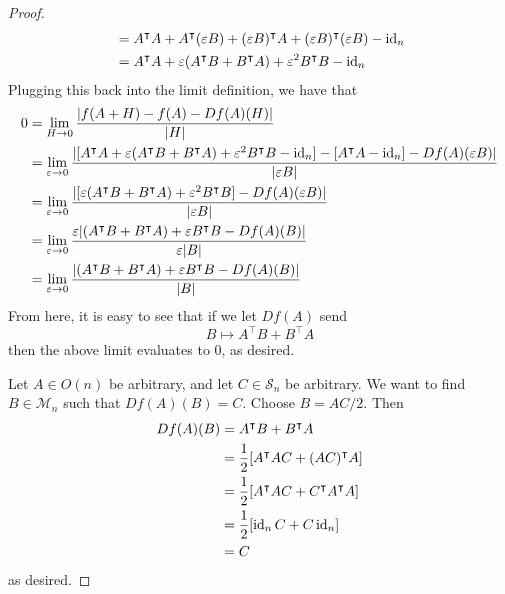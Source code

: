\documentclass[../psets.tex]{subfiles}
\begin{document}
\begin{enumerate}[label={\textbf{4.1.\roman*.}}]
\begin{proof}
\begin{align*}
            &= A^\intercal A+A^\intercal(\varepsilon B)+(\varepsilon B)^\intercal A+(\varepsilon B)^\intercal(\varepsilon B)-\operatorname{id}_n\\
            &= A^\intercal A+\varepsilon(A^\intercal B+B^\intercal A)+\varepsilon^2B^\intercal B-\operatorname{id}_n
        \end{align*}
        Plugging this back into the limit definition, we have that
        \begin{align*}
            0 &= \lim_{H\to 0}\frac{|f(A+H)-f(A)-Df(A)(H)|}{|H|}\\
            &= \lim_{\varepsilon\to 0}\frac{|[A^\intercal A+\varepsilon(A^\intercal B+B^\intercal A)+\varepsilon^2B^\intercal B-\operatorname{id}_n]-[A^\intercal A-\operatorname{id}_n]-Df(A)(\varepsilon B)|}{|\varepsilon B|}\\
            &= \lim_{\varepsilon\to 0}\frac{|[\varepsilon(A^\intercal B+B^\intercal A)+\varepsilon^2B^\intercal B]-Df(A)(\varepsilon B)|}{|\varepsilon B|}\\
            &= \lim_{\varepsilon\to 0}\frac{\varepsilon|(A^\intercal B+B^\intercal A)+\varepsilon B^\intercal B-Df(A)(B)|}{\varepsilon|B|}\\
            &= \lim_{\varepsilon\to 0}\frac{|(A^\intercal B+B^\intercal A)+\varepsilon B^\intercal B-Df(A)(B)|}{|B|}
        \end{align*}
        From here, it is easy to see that if we let $Df(A)$ send
        \begin{equation*}
            B \mapsto A^\intercal B+B^\intercal A
        \end{equation*}
        then the above limit evaluates to 0, as desired.\par
        Let $A\in O(n)$ be arbitrary, and let $C\in\mathcal{S}_n$ be arbitrary. We want to find $B\in\mathcal{M}_n$ such that $Df(A)(B)=C$. Choose $B=AC/2$. Then
        \begin{align*}
            Df(A)(B) &= A^\intercal B+B^\intercal A\\
            &= \frac{1}{2}[A^\intercal AC+(AC)^\intercal A]\\
            &= \frac{1}{2}[A^\intercal AC+C^\intercal A^\intercal A]\\
            &= \frac{1}{2}[\operatorname{id}_nC+C\operatorname{id}_n]\\
            &= C
        \end{align*}
        as desired.
    \end{proof}
\end{enumerate}
\end{document}
